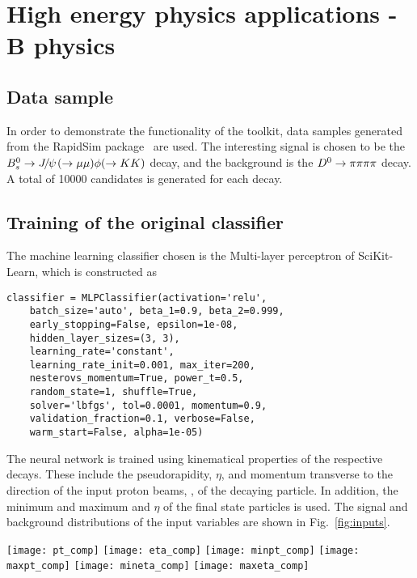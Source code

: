 \section{High energy physics applications - B physics}
\label{sec:hep}

\subsection{Data sample}

In order to demonstrate the functionality of the toolkit, data samples generated
from the RapidSim package~\cite{rapid} are used. The interesting signal is chosen
to be the ${{B}^0_{s}}\rightarrow{\ensuremath{{J\mskip -3mu/\mskip -2mu\psi\mskip 2mu}}}(\rightarrow\mu\mu )\phi (\rightarrow KK )$ decay, and the background is
the ${{D}^0}\rightarrow\pi\pi\pi\pi$ decay. A total of 10000 candidates is generated for each decay.

\subsection{Training of the original classifier}

The machine learning classifier chosen is the Multi-layer perceptron of SciKit-Learn,
which is constructed as
\begin{lstlisting}
classifier = MLPClassifier(activation='relu', 
    batch_size='auto', beta_1=0.9, beta_2=0.999, 
    early_stopping=False, epsilon=1e-08, 
    hidden_layer_sizes=(3, 3), 
    learning_rate='constant',
    learning_rate_init=0.001, max_iter=200,
    nesterovs_momentum=True, power_t=0.5, 
    random_state=1, shuffle=True,
    solver='lbfgs', tol=0.0001, momentum=0.9,
    validation_fraction=0.1, verbose=False,
    warm_start=False, alpha=1e-05)
\end{lstlisting}

The neural network is trained using kinematical properties of the respective decays.
These include the pseudorapidity, $\eta$, and momentum transverse to the direction of the 
input proton beams, \pt, of the decaying particle. In addition, the minimum and maximum \pt and $\eta$ 
of the final state particles is used. The signal and background distributions of the input variables
are shown in Fig.~\ref{fig:inputs}.
%
\begin{figure*}[t]
\centering
\texttt{[image: pt\_comp]}
\texttt{[image: eta\_comp]}
\texttt{[image: minpt\_comp]}
\texttt{[image: maxpt\_comp]}
\texttt{[image: mineta\_comp]}
\texttt{[image: maxeta\_comp]}
\caption{\small Comparison of the signal and background distributions
used to train the SciKit-Learn classifier .}
\label{fig:inputs}
\end{figure*}

